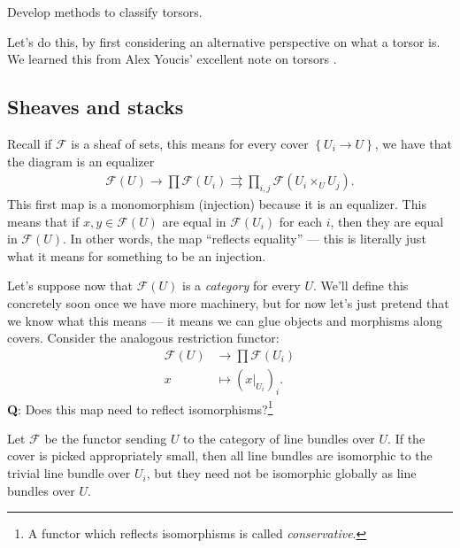\documentclass[11pt,openany]{book}
\begin{document}
\begin{goal} Develop methods to classify torsors.
\end{goal}





Let's do this, by first considering an alternative perspective on what a torsor is. We learned this from Alex Youcis' excellent note on torsors \cite{Youcis}.

\subsection{Sheaves and stacks}

Recall if $\mathscr{F}$ is a sheaf of sets, this means for every cover $\left\{ U_i \to U \right\}$, we have that the diagram is an equalizer
\begin{align*}
    \mathcal{F}(U) \to \prod \mathcal{F}(U_i) \rightrightarrows \prod_{i,j} \mathcal{F}(U_i \times_U U_j).
\end{align*}
This first map is a monomorphism (injection) because it is an equalizer. This means that if $x,y \in \mathcal{F}(U)$ are equal in $\mathcal{F}(U_i)$ for each $i$, then they are equal in $\mathcal{F}(U)$. In other words, the map ``reflects equality'' --- this is literally just what it means for something to be an injection.

Let's suppose now that $\mathcal{F}(U)$ is a \textit{category} for every $U$. We'll define this concretely soon once we have more machinery, but for now let's just pretend that we know what this means --- it means we can glue objects and morphisms along covers. Consider the analogous restriction functor:
\begin{align*}
    \mathcal{F}(U) &\to \prod \mathcal{F}(U_i) \\
    x &\mapsto \left( x|_{U_i} \right)_i.
\end{align*}
%
\textbf{Q}: Does this map need to reflect isomorphisms?\footnote{A functor which reflects isomorphisms is called \textit{conservative}.}

\begin{example} Let $\mathcal{F}$ be the functor sending $U$ to the category of line bundles over $U$. If the cover is picked appropriately small, then all line bundles are isomorphic to the trivial line bundle over $U_i$, but they need not be isomorphic globally as line bundles over $U$.
\end{example}
\end{document}
